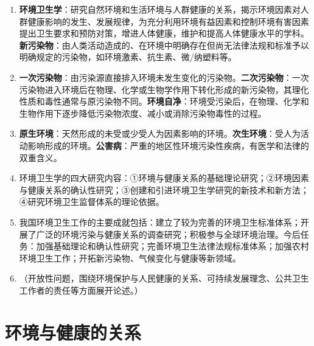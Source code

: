 \documentclass[10pt,a4paper,oneside]{ctexbook}
\begin{document}
\begin{enumerate}[leftmargin=*, itemsep=5pt]
    \item \textbf{环境卫生学}：研究自然环境和生活环境与人群健康的关系，揭示环境因素对人群健康影响的发生、发展规律，为充分利用环境有益因素和控制环境有害因素提出卫生要求和预防对策，增进人体健康，维护和提高人体健康水平的学科。\textbf{新污染物}：由人类活动造成的、在环境中明确存在但尚无法律法规和标准予以明确规定的污染物，如环境激素、抗生素、微/纳塑料等。

    \item \textbf{一次污染物}：由污染源直接排入环境未发生变化的污染物。\textbf{二次污染物}：一次污染物进入环境后在物理、化学或生物学作用下转化形成的新污染物，其理化性质和毒性通常与原污染物不同。\textbf{环境自净}：环境受污染后，在物理、化学和生物作用下逐步降低污染物浓度、减小或消除污染物毒性的过程。

    \item \textbf{原生环境}：天然形成的未受或少受人为因素影响的环境。\textbf{次生环境}：受人为活动影响形成的环境。\textbf{公害病}：严重的地区性环境污染性疾病，有医学和法律的双重含义。

    \item 环境卫生学的四大研究内容：①环境与健康关系的基础理论研究；②环境因素与健康关系的确认性研究；③创建和引进环境卫生学研究的新技术和新方法；④研究环境卫生监督体系的理论依据。

    \item 我国环境卫生工作的主要成就包括：建立了较为完善的环境卫生标准体系；开展了广泛的环境污染与健康关系的调查研究；积极参与全球环境治理。今后任务：加强基础理论和确认性研究；完善环境卫生法律法规标准体系；加强农村环境卫生工作；开拓新污染物、气候变化与健康等新领域。

    \item （开放性问题，围绕环境保护与人民健康的关系、可持续发展理念、公共卫生工作者的责任等方面展开论述。）
\end{enumerate}

\newpage

\chapter{环境与健康的关系}
\setcounter{chapter}{2}
\end{document}
